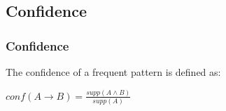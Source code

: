 
\subsection{Confidence}

\subsubsection{Confidence}

The confidence of a frequent pattern is defined as:

\(conf (A\rightarrow B)=\frac{supp(A\land B)}{supp(A)}\)

